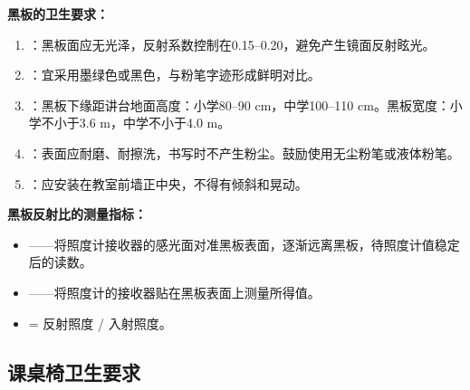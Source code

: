 \begin{keybox}
\textbf{黑板的卫生要求：}

\begin{enumerate}[leftmargin=*]
    \item {}：黑板面应无光泽，反射系数控制在0.15--0.20，避免产生镜面反射眩光。
    \item {}：宜采用墨绿色或黑色，与粉笔字迹形成鲜明对比。
    \item {}：黑板下缘距讲台地面高度：小学80--90 cm，中学100--110 cm。黑板宽度：小学不小于3.6 m，中学不小于4.0 m。
    \item {}：表面应耐磨、耐擦洗，书写时不产生粉尘。鼓励使用无尘粉笔或液体粉笔。
    \item {}：应安装在教室前墙正中央，不得有倾斜和晃动。
\end{enumerate}

\textbf{黑板反射比的测量指标：}
\begin{itemize}[leftmargin=*]
    \item {}——将照度计接收器的感光面对准黑板表面，逐渐远离黑板，待照度计值稳定后的读数。
    \item {}——将照度计的接收器贴在黑板表面上测量所得值。
    \item {} = 反射照度 / 入射照度。
\end{itemize}
\end{keybox}

\subsection{课桌椅卫生要求}

